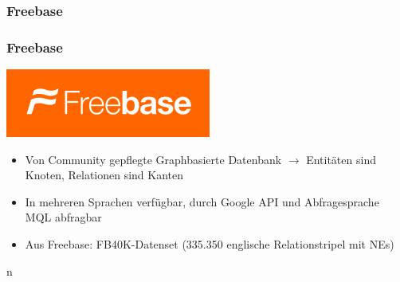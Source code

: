 \documentclass[10pt,xcolor={usenames,dvipsnames,svgnames,table}]{beamer}
\begin{document}
	\begin{frame}
		\subsubsection{Freebase}
		\frametitle{Freebase}
		\begin{center}
			\includegraphics[scale=0.70]{./img/freebase.png}
		\end{center}
		\begin{itemize}
			\item Von Community gepflegte Graphbasierte Datenbank $\rightarrow$ Entitäten sind Knoten, Relationen sind Kanten
			\item In mehreren Sprachen verfügbar, durch Google API und Abfragesprache MQL abfragbar
			\item Aus Freebase: FB40K-Datenset (335.350 englische Relationstripel mit NEs)
		\end{itemize}n
	\end{frame}
\end{document}
